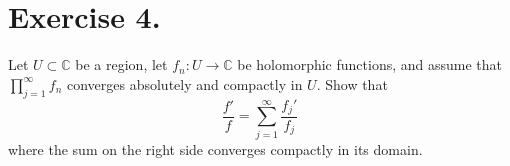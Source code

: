 
\section{Exercise 4.}

Let \(U \subset \mathbb{C}\) be a region, let \(f_n : U \to \mathbb{C}\) be holomorphic functions, and assume that \(\prod_{j=1}^{\infty} f_n\) converges absolutely and compactly in \(U\). Show that
\[
\frac{f'}{f} = \sum_{j=1}^{\infty} \frac{f_j'}{f_j}
\]
where the sum on the right side converges compactly in its domain.